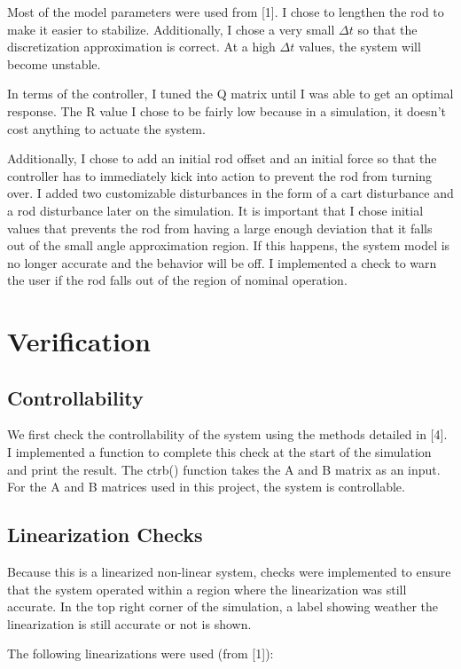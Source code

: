 \documentclass{article}
\begin{document}
Most of the model parameters were used from [1]. I chose to lengthen the rod to make it easier to stabilize. Additionally, I chose a very small $\Delta t$ so that the discretization approximation is correct. At a high $\Delta t$ values, the system will become unstable. 

In terms of the controller, I tuned the Q matrix until I was able to get an optimal response. The R value I chose to be fairly low because in a simulation, it doesn't cost anything to actuate the system.

Additionally, I chose to add an initial rod offset and an initial force so that the controller has to immediately kick into action to prevent the rod from turning over. I added two customizable disturbances in the form of a cart disturbance and a rod disturbance later on the simulation. It is important that I chose initial values that prevents the rod from having a large enough deviation that it falls out of the small angle approximation region. If this happens, the system model is no longer accurate and the behavior will be off. I implemented a check to warn the user if the rod falls out of the region of nominal operation.


\section{Verification}

\subsection{Controllability}
We first check the controllability of the system using the methods detailed in [4]. I implemented a function to complete this check at the start of the simulation and print the result. The ctrb() function takes the A and B matrix as an input. For the A and B matrices used in this project, the system is controllable.

\subsection{Linearization Checks}
Because this is a linearized non-linear system, checks were implemented to ensure that the system operated within a region where the linearization was still accurate. In the top right corner of the simulation, a label showing weather the linearization is still accurate or not is shown.

The following linearizations were used (from [1]):
\end{document}
